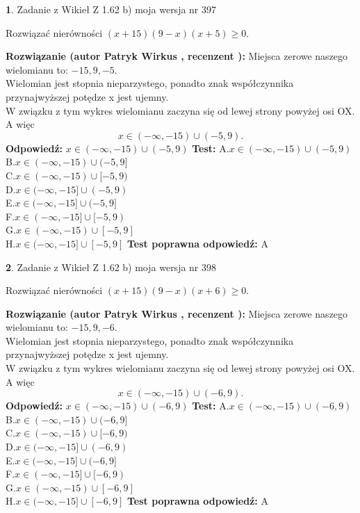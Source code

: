 \documentclass[12pt, a4paper]{article}
\theoremstyle{definition} %
\newtheorem{zad}{}
\newcommand{\zadStart}[1]{\begin{zad}#1\newline}
\newcommand{\zadStop}{\end{zad}}
\newcommand{\rozwStart}[2]{\noindent \textbf{Rozwiązanie (autor #1 , recenzent #2): }\newline}
\newcommand{\rozwStop}{\newline}
\newcommand{\odpStart}{\noindent \textbf{Odpowiedź:}\newline}
\newcommand{\odpStop}{\newline}
\newcommand{\testStart}{\noindent \textbf{Test:}\newline}
\newcommand{\testStop}{\newline}
\newcommand{\kluczStart}{\noindent \textbf{Test poprawna odpowiedź:}\newline}
\newcommand{\kluczStop}{\newline}
\begin{document}
\zadStart{Zadanie z Wikieł Z 1.62 b) moja wersja nr 397}

Rozwiązać nierówności $(x+15)(9-x)(x+5)\ge0$.
\zadStop
\rozwStart{Patryk Wirkus}{}
Miejsca zerowe naszego wielomianu to: $-15, 9, -5$.\\
Wielomian jest stopnia nieparzystego, ponadto znak współczynnika przy\linebreak najwyższej potędze x jest ujemny.\\ W związku z tym wykres wielomianu zaczyna się od lewej strony powyżej osi OX. A więc $$x \in (-\infty,-15) \cup (-5,9).$$
\rozwStop
\odpStart
$x \in (-\infty,-15) \cup (-5,9)$
\odpStop
\testStart
A.$x \in (-\infty,-15) \cup (-5,9)$\\
B.$x \in (-\infty,-15) \cup (-5,9]$\\
C.$x \in (-\infty,-15) \cup [-5,9)$\\
D.$x \in (-\infty,-15] \cup (-5,9)$\\
E.$x \in (-\infty,-15] \cup (-5,9]$\\
F.$x \in (-\infty,-15] \cup [-5,9)$\\
G.$x \in (-\infty,-15) \cup [-5,9]$\\
H.$x \in (-\infty,-15] \cup [-5,9]$
\testStop
\kluczStart
A
\kluczStop



\zadStart{Zadanie z Wikieł Z 1.62 b) moja wersja nr 398}

Rozwiązać nierówności $(x+15)(9-x)(x+6)\ge0$.
\zadStop
\rozwStart{Patryk Wirkus}{}
Miejsca zerowe naszego wielomianu to: $-15, 9, -6$.\\
Wielomian jest stopnia nieparzystego, ponadto znak współczynnika przy\linebreak najwyższej potędze x jest ujemny.\\ W związku z tym wykres wielomianu zaczyna się od lewej strony powyżej osi OX. A więc $$x \in (-\infty,-15) \cup (-6,9).$$
\rozwStop
\odpStart
$x \in (-\infty,-15) \cup (-6,9)$
\odpStop
\testStart
A.$x \in (-\infty,-15) \cup (-6,9)$\\
B.$x \in (-\infty,-15) \cup (-6,9]$\\
C.$x \in (-\infty,-15) \cup [-6,9)$\\
D.$x \in (-\infty,-15] \cup (-6,9)$\\
E.$x \in (-\infty,-15] \cup (-6,9]$\\
F.$x \in (-\infty,-15] \cup [-6,9)$\\
G.$x \in (-\infty,-15) \cup [-6,9]$\\
H.$x \in (-\infty,-15] \cup [-6,9]$
\testStop
\kluczStart
A
\kluczStop
\end{document}
